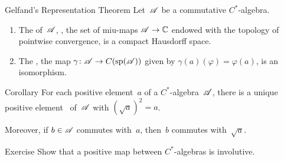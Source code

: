 \documentclass[main]{subfiles}
\begin{document}
\begin{parsec}[gelfand]%
\begin{point}{Gelfand's Representation Theorem}%
Let~$\mathscr{A}$ be a commutative $C^*$-algebra.
\begin{enumerate}
\item
The  of~$\mathscr{A}$, ,
the set 
of miu-maps $\mathscr{A}\to \mathbb{C}$
endowed with the topology of pointwise convergence,
is a compact Hausdorff space.

\item
The ,
the map $\gamma\colon \mathscr{A}\to C(\mathrm{sp}(\mathscr{A}))$
given by $\gamma(a)(\varphi)=\varphi(a)$,
is an isomorphism.
\end{enumerate}
\end{point}
\end{parsec}
%
%
\begin{parsec}%
\begin{point}{Corollary}%
For each positive element~$a$ of a $C^*$-algebra~$\mathscr{A}$,
there is a unique positive element~ of~$\mathscr{A}$
with $(\sqrt{a})^2 = a$.

\begin{point}%
Moreover,
if $b\in \mathscr{A}$ commutes with~$a$,
then~$b$ commutes with~$\sqrt{a}$.
\end{point}
\end{point}
\end{parsec}
%
%
%
\begin{parsec}%
\begin{point}{Exercise}
Show that a positive map between $C^*$-algebras
is involutive.
\end{point}
\end{parsec}
\end{document}
